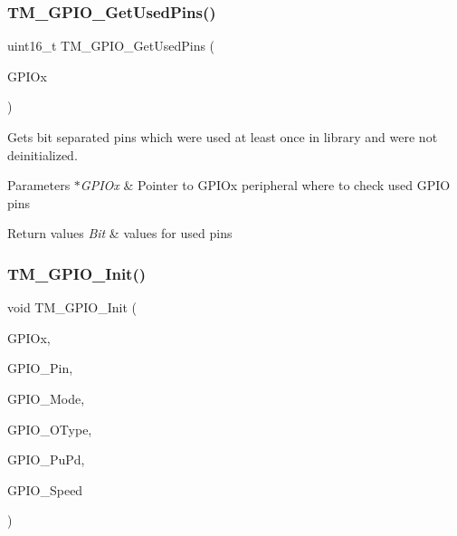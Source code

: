 \subsubsection{\texorpdfstring{T\+M\+\_\+\+G\+P\+I\+O\+\_\+\+Get\+Used\+Pins()}{TM\_GPIO\_GetUsedPins()}}
{\footnotesize\ttfamily uint16\+\_\+t T\+M\+\_\+\+G\+P\+I\+O\+\_\+\+Get\+Used\+Pins (\begin{DoxyParamCaption}\item[{G\+P\+I\+O\+\_\+\+Type\+Def $\ast$}]{G\+P\+I\+Ox }\end{DoxyParamCaption})}



Gets bit separated pins which were used at least once in library and were not deinitialized. 


\begin{DoxyParams}{Parameters}
{\em $\ast$\+G\+P\+I\+Ox} & Pointer to G\+P\+I\+Ox peripheral where to check used G\+P\+IO pins \\
\hline
\end{DoxyParams}

\begin{DoxyRetVals}{Return values}
{\em Bit} & values for used pins \\
\hline
\end{DoxyRetVals}
\mbox{\label{group___t_m___g_p_i_o___functions_ga7ea61719f45c8d46e56f636d7ffdf0d0}} 
\subsubsection{\texorpdfstring{T\+M\+\_\+\+G\+P\+I\+O\+\_\+\+Init()}{TM\_GPIO\_Init()}}
{\footnotesize\ttfamily void T\+M\+\_\+\+G\+P\+I\+O\+\_\+\+Init (\begin{DoxyParamCaption}\item[{G\+P\+I\+O\+\_\+\+Type\+Def $\ast$}]{G\+P\+I\+Ox,  }\item[{uint16\+\_\+t}]{G\+P\+I\+O\+\_\+\+Pin,  }\item[{\hyperlink{group___t_m___g_p_i_o___typedefs_gacbb363a57d0e70ea563e494eff1db3ca}{T\+M\+\_\+\+G\+P\+I\+O\+\_\+\+Mode\+\_\+t}}]{G\+P\+I\+O\+\_\+\+Mode,  }\item[{\hyperlink{group___t_m___g_p_i_o___typedefs_ga1d443fe266a4073f40ea271ae7b8df9f}{T\+M\+\_\+\+G\+P\+I\+O\+\_\+\+O\+Type\+\_\+t}}]{G\+P\+I\+O\+\_\+\+O\+Type,  }\item[{\hyperlink{group___t_m___g_p_i_o___typedefs_ga50ddb0da56d8a388dee368c55e968602}{T\+M\+\_\+\+G\+P\+I\+O\+\_\+\+Pu\+Pd\+\_\+t}}]{G\+P\+I\+O\+\_\+\+Pu\+Pd,  }\item[{\hyperlink{group___t_m___g_p_i_o___typedefs_gaa57736d106efbe14067be22025f296c4}{T\+M\+\_\+\+G\+P\+I\+O\+\_\+\+Speed\+\_\+t}}]{G\+P\+I\+O\+\_\+\+Speed }\end{DoxyParamCaption})}



